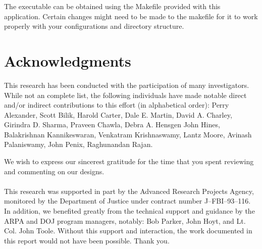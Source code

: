 The executable can be obtained using the Makefile provided with this
application. Certain changes might need to be made to the makefile for it
to work properly with your configurations and directory structure.

\newpage

\section*{Acknowledgments}
This research has been conducted with the participation of many
investigators.  While not an complete list, the following individuals
have made notable direct and/or indirect contributions to this effort
(in alphabetical order):
Perry Alexander,
Scott Bilik,
Harold Carter,
Dale E. Martin,
David A. Charley,
Girindra D. Sharma,
Praveen Chawla,
Debra A. Hensgen
John Hines,
Balakrishnan Kannikeswaran,
Venkatram Krishnaswamy,
Lantz Moore,
Avinash Palaniswamy,
John Penix,
Raghunandan Rajan.

We wish to express our sincerest gratitude for the time that you spent
reviewing and commenting on our designs.
\\
\\
This research was supported in part by the Advanced Research Projects
Agency, monitored by the Department of Justice under contract number
J--FBI--93--116.  In addition, we benefited greatly from the technical
support and guidance by the ARPA and DOJ program managers, notably: Bob
Parker, John Hoyt, and Lt. Col. John Toole.  Without this support and
interaction, the work documented in this report would not have been
possible.  Thank you.


